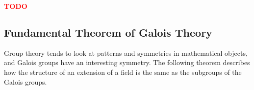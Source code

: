 \documentclass[12pt]{article}
\newtheorem{theorem}{Theorem}
\theoremstyle{definition}
\newcommand{\Aut}{\operatorname{Aut}}
\newcommand{\Fix}{\operatorname{Fix}}
\newcommand{\TODO}{\textbf{\textcolor{red}{TODO}}}
\begin{document}
\TODO

\subsection{Fundamental Theorem of Galois Theory}

%
%
%




Group theory tends to look at patterns and symmetries in mathematical objects, and Galois groups have an interesting symmetry. The following theorem describes how the structure of an extension of a field is the same as the subgroups of the Galois groups.
\end{document}
